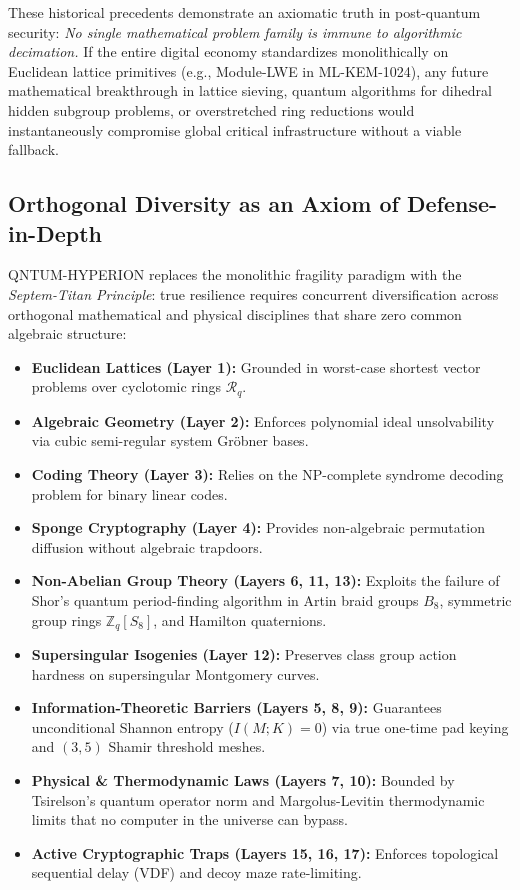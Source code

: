 \documentclass{ieeeaccess}
\newcommand{\Z}{\mathbb{Z}}
\newcommand{\calR}{\mathcal{R}}
\begin{document}
These historical precedents demonstrate an axiomatic truth in post-quantum security: \emph{No single mathematical problem family is immune to algorithmic decimation.} If the entire digital economy standardizes monolithically on Euclidean lattice primitives (e.g., Module-LWE in ML-KEM-1024), any future mathematical breakthrough in lattice sieving, quantum algorithms for dihedral hidden subgroup problems, or overstretched ring reductions would instantaneously compromise global critical infrastructure without a viable fallback.

\subsection{Orthogonal Diversity as an Axiom of Defense-in-Depth}
\textsc{QNTUM-HYPERION} replaces the monolithic fragility paradigm with the \emph{Septem-Titan Principle}: true resilience requires concurrent diversification across orthogonal mathematical and physical disciplines that share zero common algebraic structure:
\begin{itemize}
  \item \textbf{Euclidean Lattices (Layer 1):} Grounded in worst-case shortest vector problems over cyclotomic rings $\calR_q$.
  \item \textbf{Algebraic Geometry (Layer 2):} Enforces polynomial ideal unsolvability via cubic semi-regular system Gröbner bases.
  \item \textbf{Coding Theory (Layer 3):} Relies on the NP-complete syndrome decoding problem for binary linear codes.
  \item \textbf{Sponge Cryptography (Layer 4):} Provides non-algebraic permutation diffusion without algebraic trapdoors.
  \item \textbf{Non-Abelian Group Theory (Layers 6, 11, 13):} Exploits the failure of Shor's quantum period-finding algorithm in Artin braid groups $B_8$, symmetric group rings $\Z_q[S_8]$, and Hamilton quaternions.
  \item \textbf{Supersingular Isogenies (Layer 12):} Preserves class group action hardness on supersingular Montgomery curves.
  \item \textbf{Information-Theoretic Barriers (Layers 5, 8, 9):} Guarantees unconditional Shannon entropy ($I(M; K)=0$) via true one-time pad keying and $(3,5)$ Shamir threshold meshes.
  \item \textbf{Physical \& Thermodynamic Laws (Layers 7, 10):} Bounded by Tsirelson's quantum operator norm and Margolus-Levitin thermodynamic limits that no computer in the universe can bypass.
  \item \textbf{Active Cryptographic Traps (Layers 15, 16, 17):} Enforces topological sequential delay (VDF) and decoy maze rate-limiting.
\end{itemize}
\end{document}
